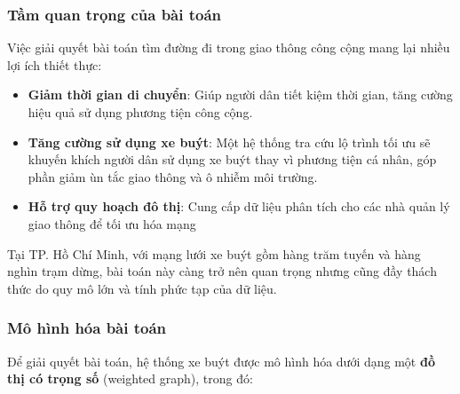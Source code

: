 \documentclass[a4paper,12pt]{article}
\begin{document}
\subsubsection{Tầm quan trọng của bài toán}

Việc giải quyết bài toán tìm đường đi trong giao thông công cộng mang lại nhiều lợi ích thiết thực:

\begin{itemize}
    \item \textbf{Giảm thời gian di chuyển}: Giúp người dân tiết kiệm thời gian, tăng cường hiệu quả sử dụng phương tiện công cộng.
    \item \textbf{Tăng cường sử dụng xe buýt}: Một hệ thống tra cứu lộ trình tối ưu sẽ khuyến khích người dân sử dụng xe buýt thay vì phương tiện cá nhân, góp phần giảm ùn tắc giao thông và ô nhiễm môi trường.
    \item \textbf{Hỗ trợ quy hoạch đô thị}: Cung cấp dữ liệu phân tích cho các nhà quản lý giao thông để tối ưu hóa mạng
\end{itemize}

Tại TP. Hồ Chí Minh, với mạng lưới xe buýt gồm hàng trăm tuyến và hàng nghìn trạm dừng, bài toán này càng trở nên quan trọng nhưng cũng đầy thách thức do quy mô lớn và tính phức tạp của dữ liệu.

\subsubsection{Mô hình hóa bài toán}

Để giải quyết bài toán, hệ thống xe buýt được mô hình hóa dưới dạng một \textbf{đồ thị có trọng số} (weighted graph), trong đó:
\end{document}
